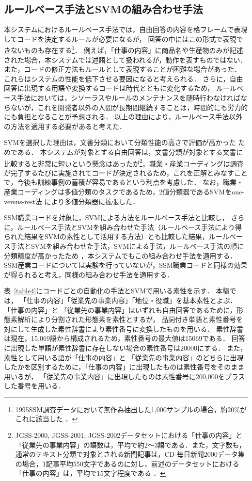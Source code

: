 \documentclass[japanese]{jnlp_1.4}
\begin{document}
\subsection{ルールベース手法とSVMの組み合わせ手法}

本システムにおけるルールベース手法では，自由回答の内容を格フレームで表現してコードを決定するルールが必要になるが， 回答の中にはこの形式で表現できないものも存在する\footnote{1995SSM調査データにおいて無作為抽出した1,000サンプルの場合，約$20\%$がこれに該当した \cite{Takahashi00}．}．
例えば，「仕事の内容」に商品名や生産物のみが記述された場合，本システムでは述語として扱われるが，動作を表すものではない．
また，コードの修正方法もルールとして表現することが困難な場合があった．
これらはシステムの性能を低下させる要因になると考えられる．
さらに，自由回答に出現する用語や変換するコードは時代とともに変化するため， ルールベース手法においては，シソーラスやルールのメンテナンスを随時行わなければならないが，これを開発者以外の人間が長期間継続することは，時間的にも労力的にも負担となることが予想される．
以上の理由により，ルールベース手法以外の方法を適用する必要があると考えた．

SVMを選択した理由は，文書分類において分類性能の高さで評価が高かった \cite{Joachims98,Sebastiani02}ためである． 本システムが対象とする自由回答は，文書分類が対象とする文書に比較すると非常に短いという懸念はあったが\footnote{JGSS-2000, JGSS-2001, JGSS-2002データセットにおける「仕事の内容」と「従業先の事業内容」の語数は，平均で約2〜3語である．また，文字数も，通常のテキスト分類で対象とされる新聞記事は，CD-毎日新聞2000データ集の場合，1記事平均550文字であるのに対し，前述のデータセットにおける「仕事の内容」は，平均で15文字程度である \cite{Takahashi_et_al05c}．}，職業・産業コーディングは調査が完了するたびに実施されてコードが決定されるため，これを正解とみなすことで，今後も訓練事例の蓄積が容易であるという利点を考慮した．
なお，職業・産業コーディングは多値分類のタスクであるため，2値分類器であるSVMをone-versus-rest法 \cite{kressel99}により多値分類器に拡張した．

SSM職業コードを対象に，SVMによる方法をルールベース手法と比較し， さらに，ルールベース手法とSVMを組み合わせた手法（ルールベース手法により得られた結果をSVMの素性として活用する方法）とも比較した結果，ルールベース手法とSVMを組み合わせた手法，SVMによる手法，ルールベース手法の順に分類精度が高かったため \cite{Takahashi_et_al05c}，本システムでもこの組み合わせ手法を適用する．
SSM産業コードについては実験を行っていないが，SSM職業コードと同様の効果が得られると考え，同様の組み合わせ手法を適用する．

表~\ref{table4}にコードごとの自動化の手法とSVMで用いる素性を示す．
本稿では， 「仕事の内容」「従業先の事業内容」「地位・役職」を基本素性とよぶ．
「仕事の内容」と 「従業先の事業内容」はいずれも自由回答であるために，形態素解析により分割された形態素を素性とするが， 品詞付き単語と素性番号を対にして生成した素性辞書により素性番号に変換したものを用いる． 
素性辞書は現在，15,069語から構成されるため，素性番号の最大値は15069である．  
回答に出現した単語が素性辞書に存在しない場合の素性番号は20000にする．
また，素性として用いる語が「仕事の内容」と 「従業先の事業内容」のどちらに出現したかを区別するために，「仕事の内容」に出現したものは素性番号をそのまま用いるが， 「従業先の事業内容」に出現したものは素性番号に200,000をプラスした番号を用いる．
\end{document}
